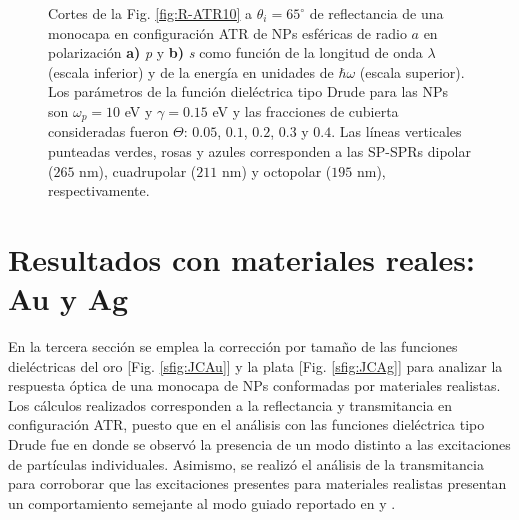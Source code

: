 \begin{figure}[h!]
\begin{subfigure}{.7\linewidth}
		\end{subfigure}\vspace*{-.7em}
	\caption{Cortes de la Fig. \ref{fig:R-ATR10} a $\theta_i = 65^\circ$ de reflectancia de una monocapa en configuración ATR de NPs esféricas de radio $a$ en polarización \textbf{a)} \emph{p} y \textbf{b)} \emph{s} como función de la longitud de onda $\lambda$ (escala inferior) y de la energía en unidades de $\hbar \omega$ (escala superior). Los parámetros de la función dieléctrica tipo Drude para las NPs son $\omega_p = 10$ eV y $\gamma = 0.15$ eV y las fracciones de cubierta consideradas fueron $\Theta$: $0. 05$, $0. 1$, $0. 2$, $0. 3$ y $0. 4$. Las líneas verticales punteadas verdes, rosas y azules corresponden a las SP-SPRs dipolar ($265$ nm), cuadrupolar ($211$ nm) y octopolar ($195$ nm), respectivamente.  }\label{fig:RT-Omegas}
	\end{figure}	









\section{Resultados con materiales reales: Au y Ag}

En la tercera sección se emplea la corrección por tamaño de las funciones dieléctricas del oro [Fig. \ref{sfig:JCAu}] y la plata [Fig. \ref{sfig:JCAg}] para analizar la respuesta óptica de una monocapa de NPs conformadas por materiales realistas. Los cálculos realizados corresponden a la reflectancia y transmitancia en configuración ATR, puesto que en el análisis con las funciones dieléctrica tipo Drude fue en donde se observó la presencia de un modo distinto a las excitaciones de partículas individuales. Asimismo, se realizó el análisis de la transmitancia para corroborar que las excitaciones presentes para materiales realistas presentan un comportamiento semejante al modo guiado reportado en \cite{kabashin2009plasmonic} y \cite{danilov2018ultra}.

